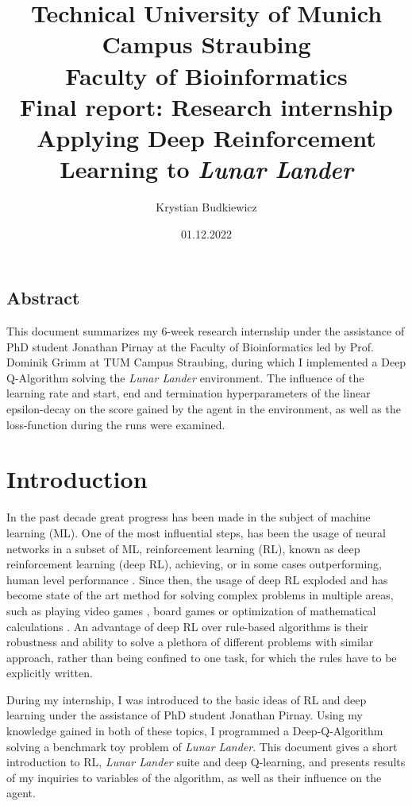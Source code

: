 \documentclass{article}
\title{
  \textbf{
    \huge Technical University of Munich \\ Campus Straubing \\ Faculty of Bioinformatics
        }\\
  \vspace{0,25cm}
  \huge Final report: Research internship \\ Applying Deep Reinforcement Learning to \textit{Lunar Lander}
  }
\author{\huge Krystian Budkiewicz}
\date{\huge 01.12.2022}
\begin{document}
\maketitle
\vspace{4cm}
\tableofcontents

\newpage
\begin{centering}
    \section*{Abstract}
    This document summarizes my 6-week research internship under the assistance of PhD student Jonathan Pirnay at the Faculty of Bioinformatics led by Prof. Dominik Grimm at TUM Campus Straubing, during which I implemented a Deep Q-Algorithm solving the \textit{Lunar Lander} environment. The influence of the learning rate and start, end and termination hyperparameters of the linear epsilon-decay on the score gained by the agent in the environment, as well as the loss-function during the runs were examined.
\end{centering}

\section{Introduction}
In the past decade great progress has been made in the subject of machine learning (ML). One of the most influential steps, has been the usage of neural networks in a subset of ML, reinforcement learning (RL), known as deep reinforcement learning (deep RL), achieving, or in some cases outperforming, human level performance \cite{mnih2015human}. Since then, the usage of deep RL exploded and has become state of the art method for solving complex problems in multiple areas, such as playing video games \cite{mnih2015human}\cite{mnih2013playing}, board games \cite{silver2016mastering}\cite{silver2018general} or optimization of mathematical calculations \cite{fawzi2022discovering}. An advantage of deep RL over rule-based algorithms is their robustness and ability to solve a plethora of different problems with similar approach, rather than being confined to one task, for which the rules have to be explicitly written.

During my internship, I was introduced to the basic ideas of RL and deep learning under the assistance of PhD student Jonathan Pirnay. Using my knowledge gained in both of these topics, I programmed a Deep-Q-Algorithm solving a benchmark toy problem of \textit{Lunar Lander}. This document gives a short introduction to RL, \textit{Lunar Lander} suite and deep Q-learning, and  presents results of my inquiries to variables of the algorithm, as well as their influence on the agent.
\end{document}
